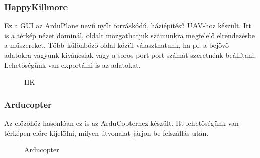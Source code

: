 \documentclass[12pt]{article}
\begin{document}
\begin{itemize}
\subsubsection{HappyKillmore}
\cite{bib:hk} Ez a GUI az ArduPlane nev\H{u} nyílt forráskódú, háziépítés\H{u} UAV-hoz készült.
Itt is a térkép nézet dominál, oldalt mozgathatjuk számunkra megfelel\H{o} elrendezésbe a m\H{u}szereket.
Több különböz\H{o} oldal közül választhatunk, ha pl. a bejöv\H{o} adatokra vagyunk kiváncsiak vagy a soros port port számát szeretnénk beállítani. Lehet\H{o}ségünk van exportálni is az adatokat.


\begin{figure}[!h]
	\centering
		\caption{HK}
	\label{fig:hk}
\end{figure}


\subsubsection{Arducopter}
Az el\H{o}z\H{o}höz hasonlóan ez is az ArduCopterhez készült. Itt lehet\H{o}ségünk van térképen el\H{o}re kijelölni, milyen útvonalat járjon be felszállás után.


\begin{figure}[H]
	\centering
	\caption{Arducopter}
	\label{fig:hk}
\end{figure}



\end{itemize}
\end{document}
